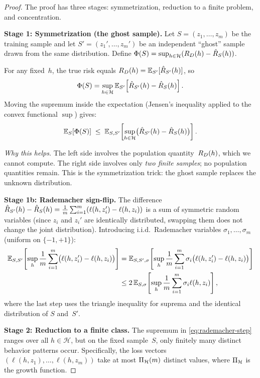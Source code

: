 \begin{proof}
The proof has three stages: symmetrization, reduction to a finite
problem, and concentration.

\textbf{Stage 1: Symmetrization (the ghost sample).}
Let $S = (z_1, \ldots, z_m)$ be the training sample and let
$S' = (z_1', \ldots, z_m')$ be an independent ``ghost'' sample drawn
from the same distribution.  Define
$\Phi(S) = \sup_{h \in \mathcal{H}} (R_D(h) - \hat{R}_S(h))$.

For any fixed~$h$, the true risk equals
$R_D(h) = \mathbb{E}_{S'}[\hat{R}_{S'}(h)]$, so
\[
  \Phi(S) = \sup_{h \in \mathcal{H}} \mathbb{E}_{S'}\!\left[
    \hat{R}_{S'}(h) - \hat{R}_S(h)\right].
\]
Moving the supremum inside the expectation (Jensen's inequality applied
to the convex functional $\sup$) gives:
\begin{equation}
\label{eq:symm-step}
  \mathbb{E}_S[\Phi(S)]
  \;\leq\; \mathbb{E}_{S,S'}\!\left[\sup_{h \in \mathcal{H}}
    \bigl(\hat{R}_{S'}(h) - \hat{R}_S(h)\bigr)\right].
\end{equation}

\emph{Why this helps.}  The left side involves the population
quantity~$R_D(h)$, which we cannot compute.  The right side involves
only \emph{two finite samples}; no population quantities remain.  This is
the symmetrization trick: the ghost sample replaces the unknown
distribution.

\textbf{Stage 1b: Rademacher sign-flip.}
The difference $\hat{R}_{S'}(h) - \hat{R}_S(h) =
\frac{1}{m}\sum_{i=1}^m (\ell(h,z_i') - \ell(h,z_i))$ is a sum of
symmetric random variables (since $z_i$ and $z_i'$ are identically
distributed, swapping them does not change the joint distribution).
Introducing i.i.d.\ Rademacher variables $\sigma_1,\ldots,\sigma_m$
(uniform on $\{-1,+1\}$):
\begin{align}
  \mathbb{E}_{S,S'}\!\left[\sup_{h} \frac{1}{m}\sum_{i=1}^m
    \bigl(\ell(h,z_i') - \ell(h,z_i)\bigr)\right]
  &= \mathbb{E}_{S,S',\sigma}\!\left[\sup_{h} \frac{1}{m}\sum_{i=1}^m
    \sigma_i\bigl(\ell(h,z_i') - \ell(h,z_i)\bigr)\right]
    \nonumber \\
  &\leq 2\,\mathbb{E}_{S,\sigma}\!\left[\sup_{h} \frac{1}{m}\sum_{i=1}^m
    \sigma_i \ell(h,z_i)\right],
    \label{eq:rademacher-step}
\end{align}
where the last step uses the triangle inequality for suprema and the
identical distribution of $S$ and~$S'$.

\textbf{Stage 2: Reduction to a finite class.}
The supremum in \eqref{eq:rademacher-step} ranges over all
$h \in \mathcal{H}$, but on the fixed sample~$S$, only finitely many
distinct behavior patterns occur.  Specifically, the loss vectors
$(\ell(h,z_1), \ldots, \ell(h,z_m))$ take at most $\Pi_\mathcal{H}(m)$
distinct values, where $\Pi_\mathcal{H}$ is the growth function.


\end{proof}
